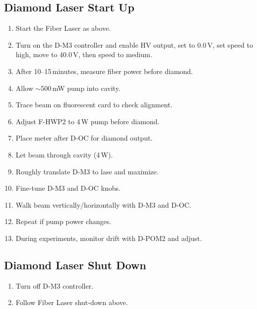 \documentclass{article}
\begin{document}
\subsection{Diamond Laser Start Up}
\begin{enumerate}
  \item Start the Fiber Laser as above.
  \item Turn on the D-M3 controller and enable HV output, set to 0.0\,V, set speed to high, move to 40.0\,V, then speed to medium.
  \item After 10--15\,minutes, measure fiber power before diamond.
  \item Allow $\sim$500\,mW pump into cavity.
  \item Trace beam on fluorescent card to check alignment.
  \item Adjust F-HWP2 to 4\,W pump before diamond.
  \item Place meter after D-OC for diamond output.
  \item Let beam through cavity (4\,W).
  \item Roughly translate D-M3 to lase and maximize.
  \item Fine-tune D-M3 and D-OC knobs.
  \item Walk beam vertically/horizontally with D-M3 and D-OC.
  \item Repeat if pump power changes.
  \item During experiments, monitor drift with D-POM2 and adjust.
\end{enumerate}

\subsection{Diamond Laser Shut Down}
\begin{enumerate}
  \item Turn off D-M3 controller.
  \item Follow Fiber Laser shut-down above.
\end{enumerate}
\end{document}
